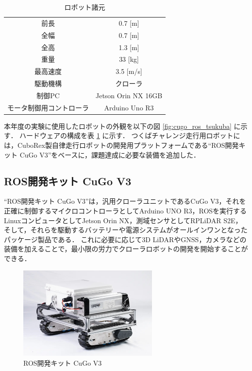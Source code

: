 \documentclass[platex,dvipdfmx]{rbproceedings}
\begin{document}
\begin{table}[htbp]
    \centering
    \caption{ロボット諸元}
    \label{tab:cugo_ros_tsukuba_spec}
    \begin{tabular}{cc}
        \hline
        前長     & 0.7 [m] \\
        全幅     & 0.7 [m] \\
        全高     & 1.3 [m] \\
        重量     & 33  [kg] \\
        最高速度 & 3.5 [m/s] \\
        駆動機構 & クローラ \\
        制御PC   & Jetson Orin NX 16GB \\
        モータ制御用コントローラ & Arduino Uno R3 \\
        \hline
    \end{tabular}
\end{table}



本年度の実験に使用したロボットの外観を以下の図 \ref{fig:cugo_ros_tsukuba} に示す．
ハードウェアの構成を表 \ref{tab:cugo_ros_tsukuba_spec} に示す．
つくばチャレンジ走行用ロボットには，CuboRex製自律走行ロボットの開発用プラットフォームである“ROS開発キット CuGo V3”をベースに，課題達成に必要な装備を追加した．

\subsection{ROS開発キット CuGo V3}
“ROS開発キット CuGo V3”は，汎用クローラユニットであるCuGo V3，それを正確に制御するマイクロコントローラとしてArduino UNO R3，ROSを実行するLinuxコンピュータとしてJetson Orin NX，測域センサとしてRPLiDAR S2E，そして，それらを駆動するバッテリーや電源システムがオールインワンとなったパッケージ製品である．
これに必要に応じて3D LiDARやGNSS，カメラなどの装備を加えることで，最小限の労力でクローラロボットの開発を開始することができる．

\begin{figure}[htbp]
    \centering   
    \includegraphics[keepaspectratio,width=70mm]{fig/cugo_ros.jpg}
    \caption{ROS開発キット CuGo V3}
    \label{fig:cugo_ros}
\end{figure}
\end{document}

